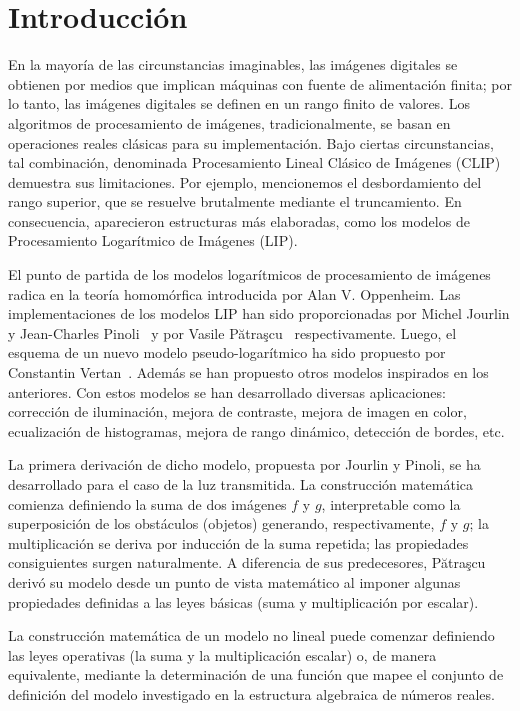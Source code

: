 \chapter*{Introducción}\label{chapter:introduction}

En la mayoría de las circunstancias imaginables, las imágenes digitales se obtienen por medios que implican máquinas con fuente de alimentación finita; por lo tanto, las imágenes digitales se definen en un rango finito de valores. Los algoritmos de procesamiento de imágenes, tradicionalmente, se basan en operaciones reales clásicas para su implementación. Bajo ciertas circunstancias, tal combinación, denominada Procesamiento Lineal Clásico de Imágenes (CLIP) demuestra sus limitaciones. Por ejemplo, mencionemos el desbordamiento del rango superior, que se resuelve brutalmente mediante el truncamiento. En consecuencia, aparecieron estructuras más elaboradas, como los modelos de Procesamiento Logarítmico de Imágenes (LIP).

El punto de partida de los modelos logarítmicos de procesamiento de imágenes radica en la teoría homomórfica introducida por Alan V. Oppenheim. Las implementaciones de los modelos LIP han sido proporcionadas por Michel Jourlin y Jean-Charles Pinoli~\cite{jourlin1988model} y por Vasile Pătraşcu~\cite{patrascu2014mathematical} respectivamente. Luego, el esquema de un nuevo modelo pseudo-logarítmico ha sido propuesto por Constantin Vertan~\cite{vertan2008pseudo}. Adem\'as se han propuesto otros modelos inspirados en los anteriores. Con estos modelos se han desarrollado diversas aplicaciones: corrección de iluminación, mejora de contraste, mejora de imagen en color, ecualización de histogramas, mejora de rango dinámico, detección de bordes, etc.

La primera derivación de dicho modelo, propuesta por Jourlin y Pinoli, se ha desarrollado para el caso de la luz transmitida. La construcción matemática comienza definiendo la suma de dos imágenes $f$ y $g$, interpretable como la superposición de los obstáculos (objetos) generando, respectivamente, $f$ y $g$; la multiplicación se deriva por inducción de la suma repetida; las propiedades consiguientes surgen naturalmente. A diferencia de sus predecesores, Pătraşcu derivó su modelo desde un punto de vista matemático al imponer algunas propiedades definidas a las leyes básicas (suma y multiplicación por escalar).

La construcción matemática de un modelo no lineal puede comenzar definiendo las leyes operativas (la suma y la multiplicación escalar) o, de manera equivalente, mediante la determinación de una función que mapee el conjunto de definición del modelo investigado en la estructura algebraica de números reales.

